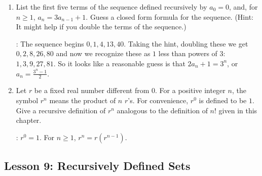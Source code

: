 \documentclass[11pt]{amsart}
\begin{document}
\begin{enumerate}
\item List the first five terms of the sequence defined recursively by
$a_0 = 0$, and, for $n\geq 1$, $a_n = 3a_{n-1}+1$. Guess a closed
form formula for the sequence. (Hint: It might help if you double
the terms of the sequence.)

: The sequence begins $0, 1, 4, 13, 40$.
Taking the hint, doubling these we get $0,2,8,26,80$ and now we
recognize these as $1$ less than powers of $3$: $1,3,9,27,81$.
So it looks like a reasonable guess is that $2a_n + 1 = 3^n$,
or $\displaystyle a_n = \frac{3^n-1}{2}$.



\item Let $r$ be a fixed real number different from $0$.
 For a positive integer $n$,
the symbol $r^n$ means the product of $n$ $r$'s. For convenience,
$r^0$ is defined to be $1$. Give a recursive definition of $r^n$
analogous to the definition of $n!$ given in this chapter.


: $r^0 = 1$. For $n\geq 1$, $r^n = r(r^{n-1})$.
\end{enumerate}

\subsection{Lesson 9: Recursively Defined Sets}
\end{document}
